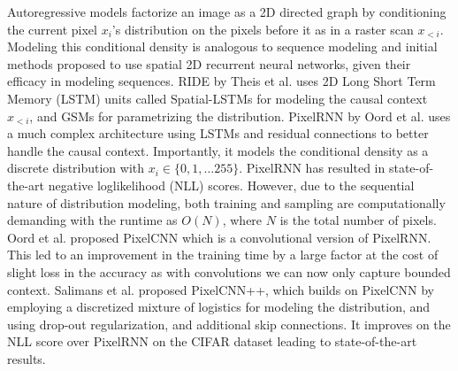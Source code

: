\documentclass[journal,twoside]{IEEEtran}
\begin{document}
Autoregressive models factorize an image as a 2D directed graph by conditioning the current pixel $x_i$'s distribution on the pixels before it as in a raster scan $x_{<i}$. Modeling this conditional density is analogous to sequence modeling and initial methods proposed to use spatial 2D recurrent neural networks, given their efficacy in modeling sequences. RIDE by Theis et al. \cite{theis2015generative} uses 2D Long Short Term Memory (LSTM) units called Spatial-LSTMs for modeling the causal context $x_{<i}$, and GSMs for parametrizing the distribution. PixelRNN by Oord et al. \cite{van2016pixel} uses a much complex architecture using LSTMs and residual connections to better handle the causal context. Importantly, it models the conditional density as a discrete distribution with $x_i \in \{0, 1, \ldots 255\}$. PixelRNN has resulted in state-of-the-art negative loglikelihood (NLL) scores. However, due to the sequential nature of distribution modeling, both training and sampling are computationally demanding with the runtime as $O(N)$, where $N$ is the total number of pixels. Oord et al. proposed PixelCNN which is a convolutional version of PixelRNN. This led to an improvement in
the training time by a large factor at the cost of slight loss in the accuracy as with convolutions we can now only capture bounded context. Salimans et al. \cite{salimans2017pixelcnn++} proposed PixelCNN++, which builds on PixelCNN by employing a discretized mixture of logistics for modeling the distribution, and using drop-out regularization, and additional skip connections. It improves on the NLL score over PixelRNN on the CIFAR dataset leading to state-of-the-art results. 

\end{document}
